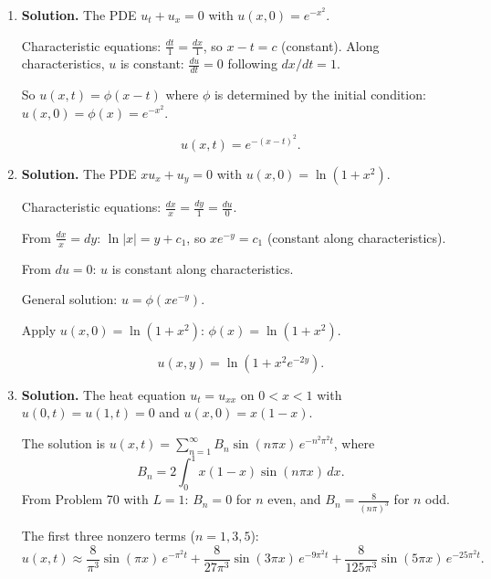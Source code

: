 \begin{enumerate}
Therefore:
\[
B_n = \frac{2}{L}\left[\frac{L^3(-1)^{n+1}}{n\pi}+\frac{L^3(-1)^n}{n\pi}-\frac{2L^3}{(n\pi)^3}[(-1)^n-1]\right]
\]
\[
= \frac{2}{L}\cdot\left[-\frac{2L^3}{(n\pi)^3}[(-1)^n-1]\right] = \frac{-4L^2}{(n\pi)^3}[(-1)^n-1].
\]
When $n$ is even, $(-1)^n-1=0$, so $B_n=0$. When $n$ is odd, $(-1)^n-1=-2$:
\[
B_n = \frac{-4L^2}{(n\pi)^3}(-2) = \frac{8L^2}{(n\pi)^3}.
\]
\[
\boxed{f(x)=x(L-x)=\frac{8L^2}{\pi^3}\sum_{\substack{n=1,3,5,\ldots}}^{\infty}\frac{1}{n^3}\sin\!\left(\frac{n\pi x}{L}\right)}.
\]

\item \textbf{Solution.}
The PDE $u_t+u_x=0$ with $u(x,0)=e^{-x^2}$.

Characteristic equations: $\frac{dt}{1}=\frac{dx}{1}$, so $x-t=c$ (constant). Along characteristics, $u$ is constant: $\frac{du}{dt}=0$ following $dx/dt=1$.

So $u(x,t)=\phi(x-t)$ where $\phi$ is determined by the initial condition: $u(x,0)=\phi(x)=e^{-x^2}$.

\[
\boxed{u(x,t)=e^{-(x-t)^2}}.
\]

\item \textbf{Solution.}
The PDE $xu_x+u_y=0$ with $u(x,0)=\ln(1+x^2)$.

Characteristic equations: $\frac{dx}{x}=\frac{dy}{1}=\frac{du}{0}$.

From $\frac{dx}{x}=dy$: $\ln|x|=y+c_1$, so $xe^{-y}=c_1$ (constant along characteristics).

From $du=0$: $u$ is constant along characteristics.

General solution: $u=\phi(xe^{-y})$.

Apply $u(x,0)=\ln(1+x^2)$: $\phi(x)=\ln(1+x^2)$.

\[
\boxed{u(x,y)=\ln(1+x^2e^{-2y})}.
\]

\item \textbf{Solution.}
The heat equation $u_t=u_{xx}$ on $0<x<1$ with $u(0,t)=u(1,t)=0$ and $u(x,0)=x(1-x)$.

The solution is $u(x,t)=\sum_{n=1}^{\infty}B_n\sin(n\pi x)\,e^{-n^2\pi^2 t}$, where
\[
B_n = 2\int_0^1 x(1-x)\sin(n\pi x)\,dx.
\]
From Problem 70 with $L=1$: $B_n=0$ for $n$ even, and $B_n=\frac{8}{(n\pi)^3}$ for $n$ odd.

The first three nonzero terms ($n=1,3,5$):
\[
\boxed{u(x,t)\approx \frac{8}{\pi^3}\sin(\pi x)\,e^{-\pi^2 t}+\frac{8}{27\pi^3}\sin(3\pi x)\,e^{-9\pi^2 t}+\frac{8}{125\pi^3}\sin(5\pi x)\,e^{-25\pi^2 t}}.
\]


\end{enumerate}
